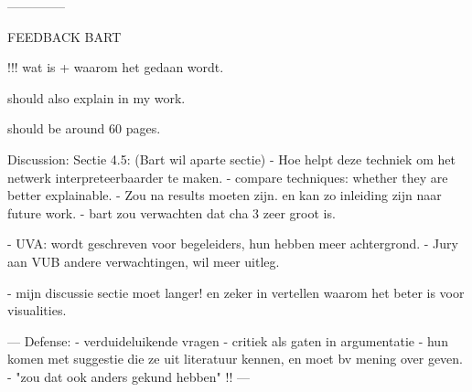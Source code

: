 

















--------------


FEEDBACK BART

!!!
wat is + waarom het gedaan wordt.

should also explain in my work.

should be around 60 pages.

Discussion:
Sectie 4.5: (Bart wil aparte sectie)
- Hoe helpt deze techniek om het netwerk interpreteerbaarder te maken.
- compare techniques: whether they are better explainable.
- Zou na results moeten zijn. en kan zo inleiding zijn naar future work.
- bart zou verwachten dat cha 3 zeer groot is.

- UVA: wordt geschreven voor begeleiders, hun hebben meer achtergrond.
- Jury aan VUB andere verwachtingen, wil meer uitleg.

- mijn discussie sectie moet langer! en zeker in vertellen waarom het beter is voor visualities.

---
Defense:
- verduideluikende vragen
- critiek als gaten in argumentatie
- hun komen met suggestie die ze uit literatuur kennen, en moet bv mening over geven.
- "zou dat ook anders gekund hebben"
!!
---




